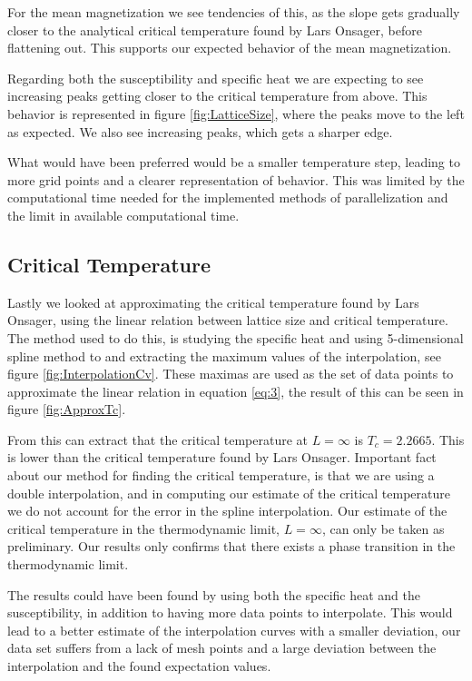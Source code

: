 \documentclass[%
reprint,
nofootinbib,
amsmath,amssymb,
aps,
]{revtex4-1}
\begin{document}
For the mean magnetization we see tendencies of this, as the slope gets gradually closer to the analytical critical temperature found by Lars Onsager, before flattening out. This supports our expected behavior of the mean magnetization. 

Regarding both the susceptibility and specific heat we are expecting to see increasing peaks getting closer to the critical temperature from above. This behavior is represented in figure \ref{fig:LatticeSize}, where the peaks move to the left as expected. We also see increasing peaks, which gets a sharper edge. 

What would have been preferred would be a smaller temperature step, leading to more grid points and a clearer representation of behavior. This was limited by the computational time needed for the implemented methods of parallelization and the limit in available computational time. 
\subsection{Critical Temperature} %
Lastly we looked at approximating the critical temperature found by Lars Onsager, using the linear relation between lattice size and critical temperature. 
The method used to do this, is studying the specific heat and using 5-dimensional spline method to and extracting the maximum values of the interpolation, see figure \ref{fig:InterpolationCv}. These maximas are used as the set of data points to approximate the linear relation in equation \eqref{eq:3}, the result of this can be seen in figure \ref{fig:ApproxTc}. 

From this can extract that the critical temperature at $L=\infty$ is $T_c = 2.2665$. This is lower than the critical temperature found by Lars Onsager. Important fact about our method for finding the critical temperature, is that we are using a double interpolation, and in computing our estimate of the critical temperature we do not account for the error in the spline interpolation. Our estimate of the critical temperature in the thermodynamic limit, $L=\infty$, can only be taken as preliminary. Our results only confirms that there exists a phase transition in the thermodynamic limit. 

The results could have been found by using both the specific heat and the susceptibility, in addition to having more data points to interpolate. This would lead to a better estimate of the interpolation curves with a smaller deviation, our data set suffers from a lack of mesh points and a large deviation between the interpolation and the found expectation values. 
\end{document}
